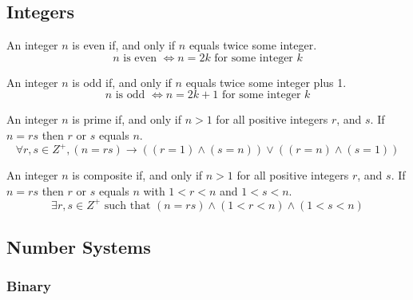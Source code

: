 \documentclass[11pt]{article}
\begin{document}
\subsection{Integers}

\begin{definition}[Even]\label{def:even}
    An integer $n$ is even if, and only if $n$ equals twice some integer.
    \begin{equation*}
        n \text{ is even } \iff n = 2k \text{ for some integer } k
    \end{equation*}
\end{definition}

\begin{definition}[Odd]\label{def:odd}
    An integer $n$ is odd if, and only if $n$ equals twice some integer plus 1.
    \begin{equation*}
        n \text{ is odd } \iff n = 2k + 1 \text{ for some integer } k
    \end{equation*}
\end{definition}

\begin{definition}[Prime]\label{def:prime}
    An integer $n$ is prime if, and only if $n > 1$ for all positive integers $r$, and $s$.
    If $n = rs$ then $r$ or $s$ equals $n$.
    \begin{equation*}
    \forall r,s \in Z^+, (n = rs) \to ((r = 1) \land (s = n)) \lor ((r = n) \land (s = 1))
    \end{equation*}
\end{definition}

\begin{definition}[Composite]\label{def:composite}
    An integer $n$ is composite if, and only if $n > 1$ for all positive integers $r$, and $s$.
    If $n = rs$ then $r$ or $s$ equals $n$ with $1 < r < n$ and $1 < s < n$.
    \begin{equation*}
        \exists r,s \in Z^+ \text{ such that } (n = rs) \land (1 < r < n) \land (1 < s < n)
    \end{equation*}
\end{definition}

\subsection{Number Systems}

\subsubsection{Binary}
\end{document}
